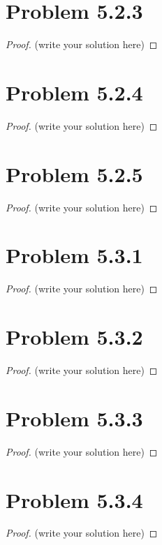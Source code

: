 \documentclass[12pt]{article}
\begin{document}
\newpage 

\section{Problem 5.2.3}

\begin{proof}
	(write your solution here)
\end{proof}

\newpage 

\section{Problem 5.2.4}

\begin{proof}
	(write your solution here)
\end{proof}

\newpage 

\section{Problem 5.2.5}

\begin{proof}
	(write your solution here)
\end{proof}

\newpage 

\section{Problem 5.3.1}

\begin{proof}
	(write your solution here)
\end{proof}
\newpage 

\section{Problem 5.3.2}

\begin{proof}
	(write your solution here)
\end{proof}
\newpage 

\section{Problem 5.3.3}

\begin{proof}
	(write your solution here)
\end{proof}
\newpage 

\section{Problem 5.3.4}

\begin{proof}
	(write your solution here)
\end{proof}
\end{document}
